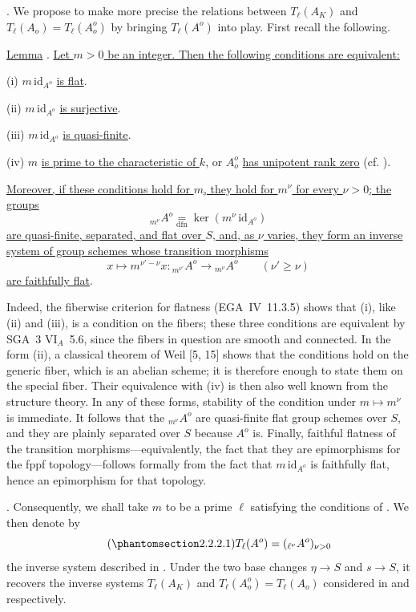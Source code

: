 
\medskip
\noindent
{}. We propose to make more precise the relations between
$T_\ell(A_K)$ and $T_\ell(A_o)=T_\ell(A_o^o)$ by bringing
$T_\ell(A^o)$ into play.  First recall the following.

\medskip
\noindent
\underline{Lemma} . \underline{Let $m>0$ be an integer.  Then the
following conditions are equivalent:}

\smallskip
\noindent
(i) $m\,\mathrm{id}_{A^o}$ \underline{is flat}.

\noindent
(ii) $m\,\mathrm{id}_{A^o}$ \underline{is surjective}.

\noindent
(iii) $m\,\mathrm{id}_{A^o}$ \underline{is quasi-finite}.

\noindent
(iv) $m$ \underline{is prime to the characteristic of $k$}, or $A_o^o$
\underline{has unipotent rank zero} (cf. ).

\smallskip
\noindent
\underline{Moreover, if these conditions hold for $m$, they hold for
$m^\nu$ for every $\nu>0$; the groups}
\[
 {}_{m^\nu}A^o\underset{\mathrm{dfn}}{=}
 \ker(m^\nu\,\mathrm{id}_{A^o})
\]
\underline{are quasi-finite, separated, and flat over $S$, and, as
$\nu$ varies, they form an inverse system of group schemes whose
transition morphisms}
\[
 x\longmapsto m^{\nu'-\nu}x:
 {}_{m^{\nu'}}A^o\longrightarrow{}_{m^\nu}A^o
 \qquad(\nu'\geq\nu)
\]
\underline{are faithfully flat}.

Indeed, the fiberwise criterion for flatness (EGA~IV~11.3.5) shows that
(i), like (ii) and (iii), is a condition on the fibers; these three
conditions are equivalent by SGA~3 $\mathrm{VI}_A$~5.6, since the
fibers in question are smooth and connected.  In the form (ii), a
classical theorem of Weil [5, 15] shows that the conditions hold on the
generic fiber, which is an abelian scheme; it is therefore enough to
state them on the special fiber.  Their equivalence with (iv) is then
also well known from the structure theory.  In any of these forms,
stability of the condition under $m\mapsto m^\nu$ is immediate.  It
follows that the ${}_{m^\nu}A^o$ are quasi-finite flat group schemes
over $S$, and they are plainly separated over $S$ because $A^o$ is.
Finally, faithful flatness of the transition morphisms---equivalently,
the fact that they are epimorphisms for the fppf topology---follows
formally from the fact that $m\,\mathrm{id}_{A^o}$ is faithfully flat,
hence an epimorphism for that topology.

\medskip
\noindent
{}. Consequently, we shall take $m$ to be a prime $\ell$ satisfying
the conditions of .  We then denote by
\begin{equation}\tag{\SGARefTarget{sga7.sga7i.eix.n2-2-2-1}{2.2.2.1}}
 T_\ell(A^o)=({}_{\ell^\nu}A^o)_{\nu>0}
\end{equation}
the inverse system described in .  Under the two base changes
$\eta\longrightarrow S$ and $s\longrightarrow S$, it recovers the
inverse systems $T_\ell(A_K)$ and
$T_\ell(A_o^o)=T_\ell(A_o)$ considered in  and  respectively.

